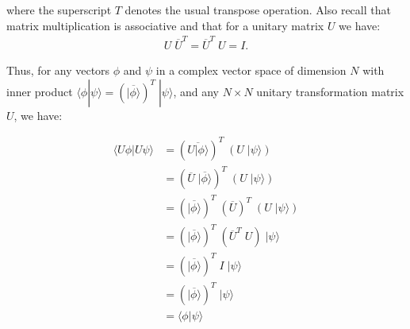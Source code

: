 \documentclass{article}
\begin{document}
where the superscript $T$ denotes the usual transpose operation. Also recall that matrix multiplication is associative and that for a unitary matrix $U$ we have:
\begin{align*}
    U\;\overline{U}^T = \overline{U}^T \; U = I.
\end{align*}

Thus, for any vectors $\phi$ and $\psi$ in a complex vector space of dimension $N$ with inner product $\langle \phi | \psi \rangle = (\overline{|\phi\rangle})^T\;|\psi\rangle$, and any $N \times N$ unitary transformation matrix $U$, we have:

\begin{align*}
    \langle U\phi | U\psi \rangle
    &= (\overline{U|\phi\rangle})^T \; (U\;|\psi\rangle)\\
    &= (\overline{U}\;\overline{|\phi\rangle})^T \; (U\;|\psi\rangle)\\
    &= (\overline{|\phi\rangle})^T\;(\overline{U})^T \; (U\;|\psi\rangle)\\
    &= (\overline{|\phi\rangle})^T\;(\overline{U}^T \; U)\;|\psi\rangle\\
    &= (\overline{|\phi\rangle})^T\;I\;|\psi\rangle\\
    &= (\overline{|\phi\rangle})^T\;|\psi\rangle\\
    &= \langle\phi|\psi\rangle\\
\end{align*}


% 


\end{document}
